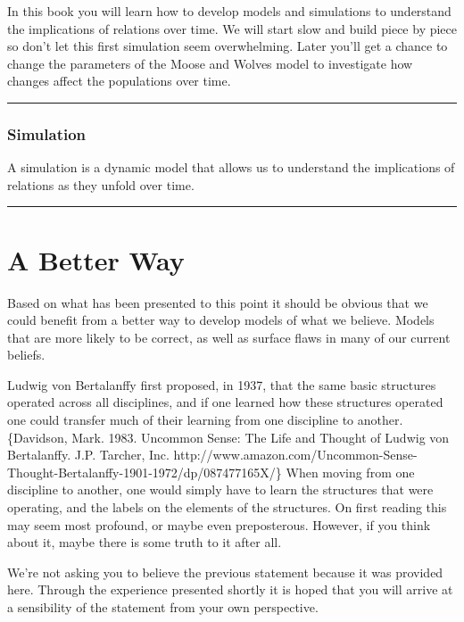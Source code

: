 \documentclass[]{memoir}
\begin{document}
In this book you will learn how to develop models and simulations to
understand the implications of relations over time. We will start slow
and build piece by piece so don't let this first simulation seem
overwhelming. Later you'll get a chance to change the parameters of the
Moose and Wolves model to investigate how changes affect the populations
over time.

\begin{center}\rule{3in}{0.4pt}\end{center}

\subsubsection{Simulation}

A simulation is a dynamic model that allows us to understand the
implications of relations as they unfold over time.

\begin{center}\rule{3in}{0.4pt}\end{center}

\section{A Better Way}

Based on what has been presented to this point it should be obvious that
we could benefit from a better way to develop models of what we believe.
Models that are more likely to be correct, as well as surface flaws in
many of our current beliefs.

Ludwig von Bertalanffy first proposed, in 1937, that the same basic
structures operated across all disciplines, and if one learned how these
structures operated one could transfer much of their learning from one
discipline to another.\{Davidson, Mark. 1983. Uncommon Sense: The Life
and Thought of Ludwig von Bertalanffy. J.P. Tarcher, Inc.
http://www.amazon.com/Uncommon-Sense-Thought-Bertalanffy-1901-1972/dp/087477165X/\}
When moving from one discipline to another, one would simply have to
learn the structures that were operating, and the labels on the elements
of the structures. On first reading this may seem most profound, or
maybe even preposterous. However, if you think about it, maybe there is
some truth to it after all.

We're not asking you to believe the previous statement because it was
provided here. Through the experience presented shortly it is hoped that
you will arrive at a sensibility of the statement from your own
perspective.
\end{document}
